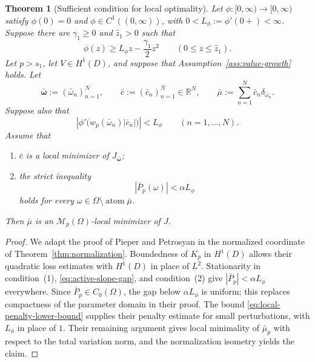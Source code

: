 \documentclass[11pt]{amsart}
\newtheorem{theorem}{Theorem}[section]
\theoremstyle{definition}
\theoremstyle{remark}
\DeclareMathOperator{\atom}{atom}
\begin{document}
\begin{theorem}[Sufficient condition for local optimality]
\label{sc_opt}
Let $\phi:[0,\infty)\to[0,\infty)$ satisfy $\phi(0)=0$ and
$\phi\in C^1((0,\infty))$, with
$0<L_\phi:=\phi'(0+)<\infty$. Suppose there are $\gamma_1\ge0$ and
$\hat z_1>0$ such that
\begin{equation}
\label{eq:local-penalty-lower-bound}
	\phi(z)\ge L_\phi z-\frac{\gamma_1}{2}z^2
	\qquad(0\le z\le\hat z_1).
\end{equation}
Let $p>s_1$, let $V\in H^1(D)$, and suppose that
Assumption~\ref{ass:value-growth} holds.
Let
\begin{equation*}
	\bar{\boldsymbol\omega}:=(\bar\omega_n)_{n=1}^N,
	\qquad
	\bar c:=(\bar c_n)_{n=1}^N\in\mathbb R^N,
	\qquad
	\bar\mu:=\sum_{n=1}^N\bar c_n\delta_{\bar\omega_n}.
\end{equation*}
Suppose also that
\begin{equation}
\label{eq:active-slope-gap}
	\left|\phi'\bigl(w_p(\bar\omega_n)|\bar c_n|\bigr)\right|<L_\phi
	\qquad(n=1,\ldots,N).
\end{equation}
Assume that
\begin{enumerate}
	\item $\bar c$ is a local minimizer of
	$J_{\bar{\boldsymbol\omega}}$;
	\item the strict inequality
	\begin{equation*}
		|\bar P_p(\omega)|<\alpha L_\phi
	\end{equation*}
	holds for every
	$\omega\in\Omega\setminus\atom\bar\mu$.
\end{enumerate}
Then $\bar\mu$ is an $\mathcal M_p(\Omega)$-local minimizer of $J$.
\end{theorem}
\begin{proof}
We adapt the proof of Pieper and Petrosyan
\cite[Theorem~4]{pieper2022nonconvex} in the normalized coordinate of
Theorem~\ref{thm:normalization}. Boundedness of $K_p$ in $H^1(D)$ allows
their quadratic loss estimates with $H^1(D)$ in place of $L^2$.
Stationarity in condition~(1), \eqref{eq:active-slope-gap}, and
condition~(2) give $|\bar P_p|<\alpha L_\phi$ everywhere. Since
$\bar P_p\in C_0(\Omega)$, the gap below $\alpha L_\phi$ is uniform;
this replaces compactness of the parameter domain in their proof.
The bound \eqref{eq:local-penalty-lower-bound} supplies their penalty
estimate for small perturbations, with $L_\phi$ in place of $1$.
Their remaining argument gives local minimality of $\bar\mu_p$ with respect to
the total variation norm, and the normalization isometry yields the claim.
\end{proof}
\end{document}
